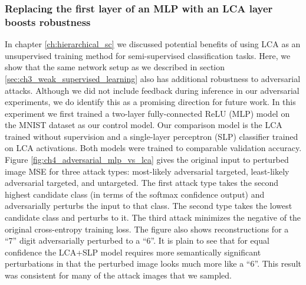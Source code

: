 \subsubsection{Replacing the first layer of an MLP with an LCA layer boosts robustness}
In chapter \ref{ch:hierarchical_sc} we discussed potential benefits of using LCA as an unsupervised training method for semi-supervised classification tasks. Here, we show that the same network setup as we described in section \ref{sec:ch3_weak_supervised_learning} also has additional robustness to adversarial attacks. Although we did not include feedback during inference in our adversarial experiments, we do identify this as a promising direction for future work. In this experiment we first trained a two-layer fully-connected ReLU (MLP) model on the MNIST dataset as our control model. Our comparison model is the LCA trained without supervision and a single-layer perceptron (SLP) classifier trained on LCA activations. Both models were trained to comparable validation accuracy. Figure \ref{fig:ch4_adversarial_mlp_vs_lca} gives the original input to perturbed image MSE for three attack types: most-likely adversarial targeted, least-likely adversarial targeted, and untargeted. The first attack type takes the second highest candidate class (in terms of the softmax confidence output) and adversarially perturbs the input to that class. The second type takes the lowest candidate class and perturbs to it. The third attack minimizes the negative of the original cross-entropy training loss. The figure also shows reconstructions for a ``7'' digit adversarially perturbed to a ``6''. It is plain to see that for equal confidence the LCA+SLP model requires more semantically significant perturbations in that the perturbed image looks much more like a ``6''. This result was consistent for many of the attack images that we sampled.

